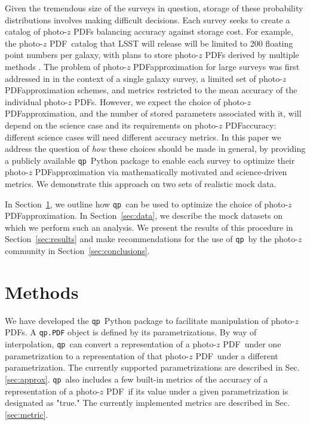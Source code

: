\documentclass[\docopts]{\docclass}
\newcommand{\qp}{\texttt{qp}}
\newcommand{\pz}{photo-$z$ PDF}
\begin{document}
Given the tremendous size of the surveys in question, storage of these
probability distributions involves making difficult decisions.  Each survey
seeks to create a catalog of \pz s balancing accuracy against storage
cost.  For example, the \pz\ catalog that LSST will release will be limited to
200 floating point numbers per galaxy, with plans to store \pz s derived by
multiple methods \citep{juric_data_2017}.
The problem of \pz approximation for large surveys was first addressed in \citet{carrasco_kind_sparse_2014} in the
context of a single galaxy survey, a limited set of \pz approximation schemes, and
metrics restricted to the mean accuracy of the individual \pz s. However, we expect the choice of \pz approximation, and the number of
stored parameters associated with it, will
depend on the science case and its requirements on \pz accuracy: different science cases will need different accuracy metrics.  In this paper we address the question of \textit{how} these choices should be
made in general, by providing a publicly available \qp\ Python package  to enable each survey to optimize their \pz approximation via mathematically motivated and science-driven metrics. We
demonstrate this approach on two sets of realistic mock data.

In Section~\ref{sec:methods}, we outline how \qp\ can be used to optimize the
choice of \pz approximation.  In Section~\ref{sec:data}, we
describe the mock datasets on which we perform such an analysis.  We present
the results of this procedure in Section~\ref{sec:results} and make
recommendations for the use of \qp\ by the photo-$z$ community in Section~\ref{sec:conclusions}.








\section{Methods}
\label{sec:methods}



We have developed the \qp\ Python package to facilitate manipulation of \pz s.
A \texttt{qp.PDF} object is defined by its parametrizations.  By way of
interpolation, \qp\ can convert a representation of a \pz\ under one
parametrization to a representation of that \pz\ under a different
parametrization.  The currently supported parametrizations are described in
Sec. \ref{sec:approx}.  \qp\ also includes a few built-in metrics of the
accuracy of a representation of a \pz\ if its value under a given
parametrization is designated as "true."  The currently implemented metrics are
described in Sec. \ref{sec:metric}.
\end{document}
